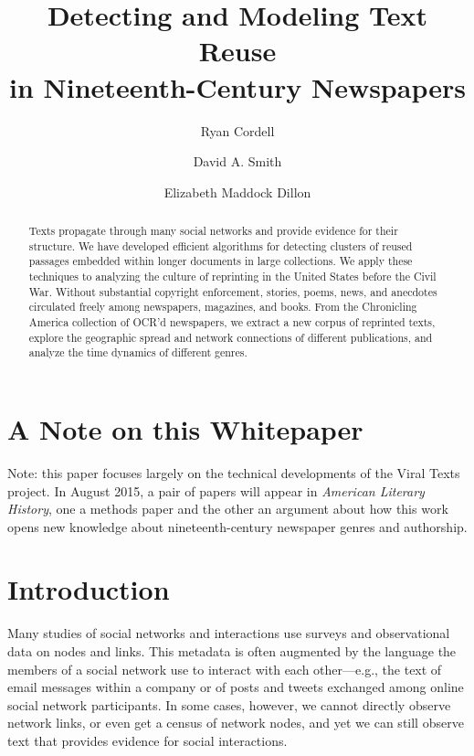 \documentclass[pdftex,11pt]{article}
\begin{document}
\title{Detecting and Modeling Text Reuse \\ in Nineteenth-Century Newspapers}

\author{Ryan Cordell \and David A. Smith \and Elizabeth Maddock Dillon}

\date{}

\maketitle


\begin{abstract}
  Texts propagate through many social networks and provide evidence
  for their structure.  We have developed efficient algorithms for detecting
  clusters of reused passages embedded within longer documents in
  large collections.  We apply these techniques to analyzing the
  culture of reprinting in the United States before the Civil War.
  Without substantial copyright enforcement, stories, poems, news, and
  anecdotes circulated freely among newspapers, magazines, and books.
  From the Chronicling America collection of OCR'd newspapers, we extract a new corpus of
  reprinted texts, explore the geographic spread and network
  connections of different publications, and analyze the time dynamics
  of different genres.
\end{abstract}

\section{A Note on this Whitepaper}
\label{sec:note}
Note: this paper focuses largely on the technical developments of the
Viral Texts project.  In August 2015, a pair of papers will appear in
\emph{American Literary History}, one a methods paper and the other an
argument about how this work opens new knowledge about
nineteenth-century newspaper genres and authorship.

\section{Introduction}
\label{sec:intro}
Many studies of social networks and interactions use surveys and
observational data on nodes and links.  This metadata is often
augmented by the language the members of a social network use to
interact with each other---e.g., the text of email messages within a
company or of posts and tweets exchanged among online social network
participants.  In some cases, however, we cannot directly observe
network links, or even get a census of network nodes, and yet we can
still observe text that provides evidence for social interactions.
\end{document}

